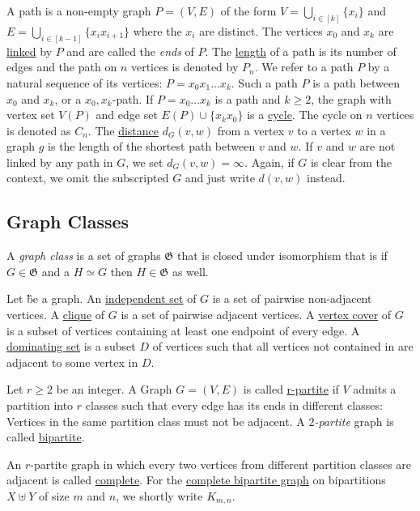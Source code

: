 \begin{definition}
    A path is a non-empty graph $P = (V,E)$ of the form $V = \bigcup_{i  \in [k]} \{x_i\}$ and $E = \bigcup_{i \in  [k-1]} \{x_ix_{i+1}\}$ where the $x_i$ are distinct. The vertices $x_0$ and $x_k$ are \underline{linked} by $P$ and are called the \textit{ends} of $P$. The \underline{length} of a path is its number of edges and the path on $n$ vertices is denoted by  $P_n$. We refer to a path $P$ by a natural sequence of its vertices: $P = x_0x_1...x_k$. Such a path $P$ is a path between $x_0$ and $x_k$, or a $x_0,x_k$-path.
    If $P = x_0...x_k$ is a path and $k \geq 2$, the graph with vertex set $V(P)$ and edge set $E(P) \cup \{x_kx_0\}$ is a \underline{cycle}. The cycle on $n$ vertices is denoted as $C_n$.
    The \underline{distance} $d_G(v,w)$ from a vertex $v$ to a vertex $w$ in a graph $g$ is the length of the shortest path between $v$ and $w$. If $v$ and $w$ are not linked by any path in $G$, we set $d_G(v,w) = \infty$. Again, if $G$ is clear from the context, we omit the subscripted $G$ and just write $d(v,w)$ instead.
\end{definition}

\subsection{Graph Classes}

A \textit{graph class} is a set of graphs $\mathfrak{G}$ that is closed under isomorphism that is if $G \in \mathfrak{G}$ and a $H \simeq G$ then $H \in \mathfrak{G}$ as well.

\begin{definition}
Let \G be a graph.
An  \underline{independent set} of $G$ is a set of pairwise non-adjacent vertices. 
A \underline{clique} of $G$ is a set of pairwise adjacent vertices. 
A \underline{vertex cover} of $G$ is a subset of vertices containing at least one endpoint of every edge. 
A \underline{dominating set} is a subset $D$ of vertices such that all vertices not contained in are adjacent to some vertex in $D$.
\end{definition}

\begin{graphclass}[r-partite]
    Let $r \geq 2$ be an integer. A Graph $G = (V, E)$ is called \underline{r-partite} if $V$ admits a partition into $r$ classes such that every edge has its ends in different classes: Vertices in the same partition class must not be adjacent. 
    A \textit{$2$-partite} graph is called \underline{bipartite}. 
    
    An $r$-partite graph in which every two vertices from different partition classes are adjacent is called \underline{complete}. For the \underline{complete bipartite graph} on bipartitions $X \uplus Y$ of size $m$ and $n$, we shortly write $K_{m,n}$. 
\end{graphclass}

